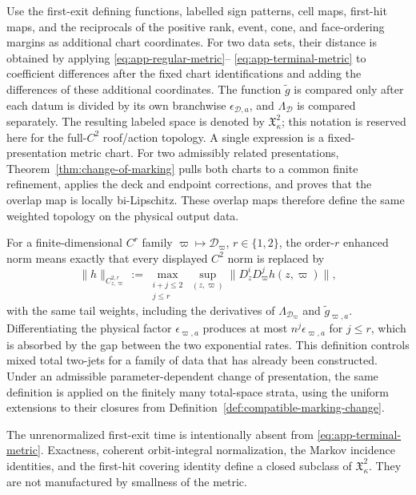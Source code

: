 \documentclass[11pt]{amsart}
\numberwithin{equation}{section}
\theoremstyle{definition}
\theoremstyle{remark}
\begin{document}
Use the first-exit defining functions, labelled sign patterns, cell maps,
first-hit maps, and the reciprocals of the positive rank, event, cone, and
face-ordering margins as additional chart coordinates.  For two data sets, their distance
is obtained by applying \eqref{eq:app-regular-metric}--
\eqref{eq:app-terminal-metric} to coefficient differences after the fixed
chart identifications and adding the differences of these additional
coordinates.  The function $\widetilde g$ is compared only after each datum
is divided by its own branchwise $\epsilon_{\mathcal D,a}$, and
$\Lambda_{\mathcal D}$ is compared separately.  The resulting labeled
space is denoted by $\mathfrak X_\kappa^2$; this notation is reserved here
for the full-$C^2$ roof/action topology.  A single expression is a
fixed-presentation metric chart.  For two admissibly related presentations,
Theorem~\ref{thm:change-of-marking} pulls both charts to a common finite
refinement, applies the deck and endpoint corrections, and proves that the
overlap map is locally bi-Lipschitz.  These overlap maps therefore define
the same weighted topology on the physical output data.

For a finite-dimensional $C^r$ family
$\varpi\mapsto\mathcal D_\varpi$, $r\in\{1,2\}$, the order-$r$ enhanced norm
means exactly that every displayed $C^2$ norm is replaced by
\begin{equation}\label{eq:app-mixed-norm}
 \|h\|_{C^{2,r}_{z,\varpi}}
 :=\max_{\substack{i+j\le2\\j\le r}}\sup_{(z,\varpi)}
       \|D_z^iD_\varpi^jh(z,\varpi)\|,
\end{equation}
with the same tail weights, including the derivatives of
$\Lambda_{\mathcal D_\varpi}$ and $\widetilde g_{\varpi,a}$.  Differentiating the
physical factor $\epsilon_{\varpi,a}$ produces at most $n^j\epsilon_{\varpi,a}$ for
$j\le r$, which is absorbed by the gap between the two exponential rates.  This definition
controls mixed total two-jets for a family of data that has already been
constructed.  Under an admissible parameter-dependent change of
presentation, the same definition is applied on the finitely many
total-space strata, using the uniform extensions to their closures from
Definition~\ref{def:compatible-marking-change}.

The unrenormalized first-exit time is intentionally absent from
\eqref{eq:app-terminal-metric}.  Exactness, coherent orbit-integral
normalization, the Markov incidence identities, and the first-hit
covering identity define a closed subclass of $\mathfrak X_\kappa^2$.
They are not manufactured by smallness of the metric.
\end{document}
